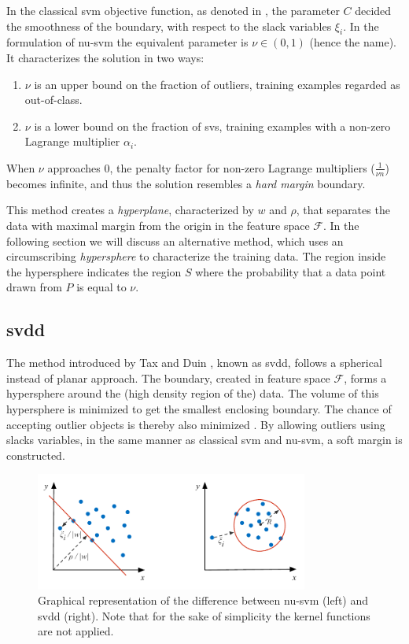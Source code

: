 In the classical \gls{svm} objective function, as denoted in , the parameter $C$ decided the smoothness of the boundary, with respect to the slack variables $\xi_i$.
In the formulation of \gls{nu-svm} the equivalent parameter is $\nu \in (0,1)$ (hence the name).
It characterizes the solution in two ways:
\begin{enumerate}
  \item $\nu$ is an upper bound on the fraction of outliers, \ie training examples regarded as out-of-class.
  \item $\nu$ is a lower bound on the fraction of \glspl{sv}, \ie training examples with a non-zero Lagrange multiplier $\alpha_i$.
\end{enumerate}
When $\nu$ approaches $0$, the penalty factor for non-zero Lagrange multipliers ($\frac{1}{\nu n}$) becomes infinite, and thus the solution resembles a \emph{hard margin} boundary.

This method creates a \emph{hyperplane}, characterized by $w$ and $\rho$, that separates the data with maximal margin from the origin in the feature space $\mathcal{F}$.
In the following section we will discuss an alternative method, which uses an circumscribing \emph{hypersphere} to characterize the training data.
The region inside the hypersphere indicates the region $S$ where the probability that a data point drawn from $P$ is equal to $\nu$.



\subsection{\acrlong{svdd}}\label{subsec:oc-svm-svdd}
The method introduced by Tax and Duin \cite{tax1999support}, known as \acrlong{svdd}, follows a spherical instead of planar approach.
The boundary, created in feature space $\mathcal{F}$, forms a hypersphere around the (high density region of the) data.
The volume of this hypersphere is minimized to get the smallest enclosing boundary.
The chance of accepting outlier objects is thereby also minimized \cite{tax2003online}.
By allowing outliers using slacks variables, in the same manner as classical \gls{svm} and \gls{nu-svm}, a soft margin is constructed.

\begin{figure}
  \centering
    \includegraphics[width=0.8\textwidth,keepaspectratio]{./Figures/chapter3/nu-vs-svdd.pdf}
  \caption[Difference \gls{nu-svm} and \gls{svdd}]{Graphical representation of the difference between \gls{nu-svm} (left) and \gls{svdd} (right). Note that for the sake of simplicity the kernel functions are not applied.}
  \label{fig:nu-vs-svdd}
\end{figure}

